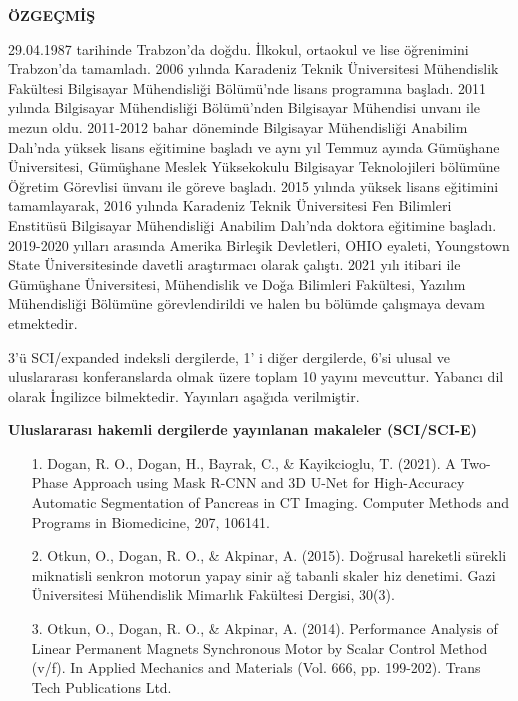 \newpage
\pagestyle{plain}
\begin{center}
{\bf ÖZGEÇMİŞ}
\end{center}
29.04.1987 tarihinde Trabzon’da doğdu. İlkokul, ortaokul ve lise öğrenimini Trabzon’da tamamladı. 2006 yılında Karadeniz Teknik Üniversitesi Mühendislik Fakültesi Bilgisayar Mühendisliği Bölümü’nde lisans programına başladı. 2011 yılında Bilgisayar Mühendisliği Bölümü’nden Bilgisayar Mühendisi unvanı ile mezun oldu. 2011-2012 bahar döneminde Bilgisayar Mühendisliği Anabilim Dalı’nda yüksek lisans eğitimine başladı ve aynı yıl  Temmuz ayında Gümüşhane Üniversitesi, Gümüşhane Meslek Yüksekokulu Bilgisayar Teknolojileri bölümüne Öğretim Görevlisi ünvanı ile göreve başladı. 2015 yılında yüksek lisans eğitimini tamamlayarak, 2016 yılında Karadeniz Teknik Üniversitesi Fen Bilimleri Enstitüsü Bilgisayar Mühendisliği Anabilim Dalı’nda doktora eğitimine başladı. 2019-2020 yılları arasında Amerika Birleşik Devletleri, OHIO eyaleti, Youngstown State Üniversitesinde davetli araştırmacı olarak çalıştı. 2021 yılı itibari ile Gümüşhane Üniversitesi, Mühendislik ve Doğa Bilimleri Fakültesi, Yazılım Mühendisliği Bölümüne görevlendirildi ve halen bu bölümde çalışmaya devam etmektedir. 

3’ü SCI/expanded indeksli dergilerde, 1’ i diğer dergilerde, 6’si ulusal ve uluslararası konferanslarda olmak üzere toplam 10 yayını mevcuttur. Yabancı dil olarak İngilizce bilmektedir. Yayınları aşağıda verilmiştir.

\singlespacing 
\singlespacing

\indent \textbf{Uluslararası hakemli dergilerde yayınlanan makaleler (SCI/SCI-E)}

\begin{enumerate}
\item[1.] Dogan, R. O., Dogan, H., Bayrak, C., \& Kayikcioglu, T. (2021). A Two-Phase Approach using Mask R-CNN and 3D U-Net for High-Accuracy Automatic Segmentation of Pancreas in CT Imaging. Computer Methods and Programs in Biomedicine, 207, 106141.
\item[2.] Otkun, O., Dogan, R. O., \& Akpinar, A. (2015). Doğrusal hareketli sürekli miknatisli senkron motorun yapay sinir ağ tabanli skaler hiz denetimi. Gazi Üniversitesi Mühendislik Mimarlık Fakültesi Dergisi, 30(3).
\item[3.] Otkun, O., Dogan, R. O., \& Akpinar, A. (2014). Performance Analysis of Linear Permanent Magnets Synchronous Motor by Scalar Control Method (v/f). In Applied Mechanics and Materials (Vol. 666, pp. 199-202). Trans Tech Publications Ltd.
\end{enumerate}


